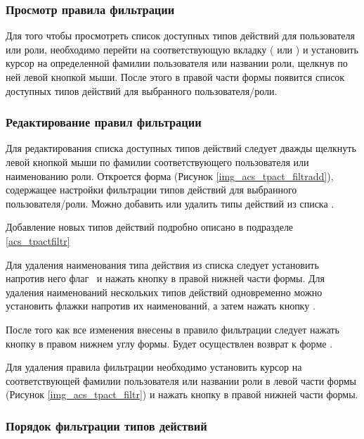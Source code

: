 \subsubsection{Просмотр правила фильтрации}

Для того чтобы просмотреть список доступных типов действий для пользователя или роли, необходимо перейти на соответствующую вкладку ( или ) и установить курсор на определенной фамилии пользователя или названии роли, щелкнув по ней левой кнопкой мыши. После этого в правой части формы появится список доступных типов действий для выбранного пользователя\slash роли.

\subsubsection{Редактирование правил фильтрации}

Для редактирования списка доступных типов действий следует дважды щелкнуть левой кнопкой мыши по фамилии соответствующего пользователя или наименованию роли. Откроется форма  (Рисунок \ref{img_acs_tpact_filtradd}), содержащее настройки фильтрации типов действий для выбранного пользователя\slash роли. Можно добавить или удалить типы действий из списка .

Добавление новых типов действий подробно описано в подразделе \ref{acs_tpactfiltr}

Для удаления наименования типа действия из списка следует установить напротив него флаг  \putx~и нажать кнопку   в правой нижней части формы. Для удаления наименований нескольких типов действий одновременно можно установить флажки   напротив их наименований, а затем нажать кнопку .

После того как все изменения внесены в правило фильтрации следует нажать кнопку   в правом нижнем углу формы. Будет осуществлен возврат к форме .

Для удаления правила фильтрации необходимо установить курсор на соответствующей фамилии пользователя или названии роли в левой части формы (Рисунок \ref{img_acs_tpact_filtr}) и нажать кнопку   в правой нижней части формы.

\subsubsection{Порядок фильтрации типов действий}

